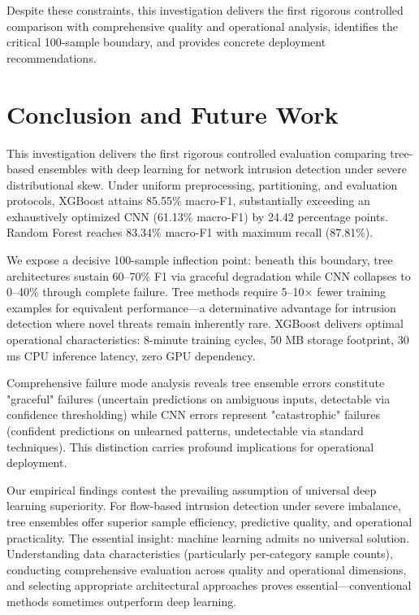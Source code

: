 \documentclass[10pt,twocolumn]{article}
\begin{document}
Despite these constraints, this investigation delivers the first rigorous controlled comparison with comprehensive quality and operational analysis, identifies the critical 100-sample boundary, and provides concrete deployment recommendations.


\section{Conclusion and Future Work}

This investigation delivers the first rigorous controlled evaluation comparing tree-based ensembles with deep learning for network intrusion detection under severe distributional skew. Under uniform preprocessing, partitioning, and evaluation protocols, XGBoost attains 85.55\% macro-F1, substantially exceeding an exhaustively optimized CNN (61.13\% macro-F1) by 24.42 percentage points. Random Forest reaches 83.34\% macro-F1 with maximum recall (87.81\%).

We expose a decisive 100-sample inflection point: beneath this boundary, tree architectures sustain 60--70\% F1 via graceful degradation while CNN collapses to 0--40\% through complete failure. Tree methods require 5--10× fewer training examples for equivalent performance—a determinative advantage for intrusion detection where novel threats remain inherently rare. XGBoost delivers optimal operational characteristics: 8-minute training cycles, 50 MB storage footprint, 30 ms CPU inference latency, zero GPU dependency.

Comprehensive failure mode analysis reveals tree ensemble errors constitute "graceful" failures (uncertain predictions on ambiguous inputs, detectable via confidence thresholding) while CNN errors represent "catastrophic" failures (confident predictions on unlearned patterns, undetectable via standard techniques). This distinction carries profound implications for operational deployment.

Our empirical findings contest the prevailing assumption of universal deep learning superiority. For flow-based intrusion detection under severe imbalance, tree ensembles offer superior sample efficiency, predictive quality, and operational practicality. The essential insight: machine learning admits no universal solution. Understanding data characteristics (particularly per-category sample counts), conducting comprehensive evaluation across quality and operational dimensions, and selecting appropriate architectural approaches proves essential—conventional methods sometimes outperform deep learning.
\end{document}
